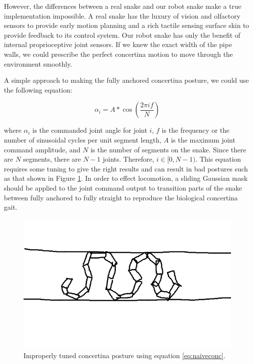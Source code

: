 However, the differences between a real snake and our robot snake make a true implementation impossible. A real snake has the luxury of vision and olfactory sensors to provide early motion planning and a rich tactile sensing surface skin to provide feedback to its control system. Our robot snake has only the benefit of internal proprioceptive joint sensors. If we knew the exact width of the pipe walls, we could prescribe the perfect concertina motion to move through the environment smoothly.

A simple approach to making the fully anchored concertina posture, we could use the following equation:

\begin{equation}
\label{eq:naiveconc}
\alpha_i = A * \cos \left( \frac{ 2 \pi if}{N} \right)
\end{equation}

where $\alpha_i$ is the commanded joint angle for joint $i$, $f$ is the frequency or the number of sinusoidal cycles per unit segment length, $A$ is the maximum joint command amplitude, and $N$ is the number of segments on the snake.   Since there are $N$ segments, there are $N-1$ joints.  Therefore, $i \in [0,N-1)$.  This equation requires some tuning to give the right results and can result in bad postures such as that shown in Figure \ref{naiveconc}.  In order to effect locomotion, a sliding Gaussian mask should be applied to the joint command output to transition parts of the snake between fully anchored to fully straight to reproduce the biological concertina gait.

\begin{figure}
\begin{center}
\includegraphics[scale=0.5]{2_problem_1.png}
\end{center}
\caption{Improperly tuned concertina posture using equation \ref{eq:naiveconc}.}
\label{naiveconc}
\end{figure}


